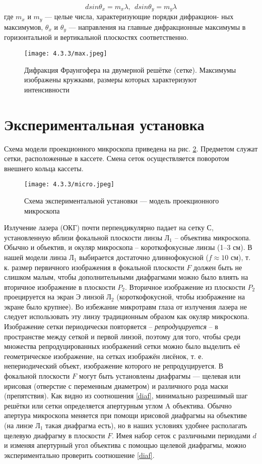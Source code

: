 \documentclass[a4paper,12pt]{article} %
\begin{document}
\begin{equation}
    dsin\theta_x = m_x\lambda,\  \  dsin\theta_y=m_y\lambda
\end{equation}
где $m_x$ и $m_y$ — целые числа, характеризующие порядки дифракцион- ных максимумов, $\theta_x$ и $\theta_y$ — направления на главные дифракционные максимумы в горизонтальной и вертикальной плоскостях соответственно.

\begin{figure}[H]
    \centering
    \texttt{[image: 4.3.3/max.jpeg]}
    \caption{\centering Дифракция Фраунгофера на двумерной решётке (сетке). Максимумы изображены кружками, размеры которых характеризуют интенсивности}
    \label{max}
\end{figure}

\section{Экспериментальная установка}

Схема модели проекционного микроскопа приведена на рис. \ref{micro}. Предметом служат сетки, расположенные в кассете. Смена сеток осуществляется поворотом внешнего кольца кассеты.

\begin{figure}[H]
    \centering
    \texttt{[image: 4.3.3/micro.jpeg]}
    \caption{Схема экспериментальной установки — модель проекционного микроскопа}
    \label{micro}
\end{figure}

Излучение лазера (ОКГ) почти перпендикулярно падает на сетку С, установленную вблизи фокальной плоскости линзы Л$_1$ -- объектива микроскопа. Обычно и объектив, и окуляр микроскопа -- короткофокусные линзы (1–3 см). В нашей модели линза Л$_1$ выбирается достаточно длиннофокусной ($f \approx 10$ см), т. к. размер первичного изображения в фокальной плоскости $F$ должен быть не слишком малым, чтобы дополнительными диафрагмами можно было влиять на вторичное изображение в плоскости $P_2$. Вторичное изображение из плоскости $P_2$ проецируется на экран Э линзой Л$_2$ (короткофокусной, чтобы изображение на экране было крупнее). Во избежание микротравм глаза от излучения лазера не следует использовать эту линзу традиционным образом как окуляр микроскопа.
Изображение сетки периодически повторяется -- \textit{репродуцируется} -- в пространстве между сеткой и первой линзой, поэтому для того, чтобы среди множества репродуцированных изображений сетки можно было выделить её геометрическое изображение, на сетках изображён лисёнок, т. е. непериодический объект, изображение которого не репродуцируется.
В фокальной плоскости $F$ могут быть установлены диафрагмы — щелевая или ирисовая (отверстие с переменным диаметром) и различного рода маски (препятствия).
Как видно из соотношения \eqref{diaf}, минимально разрешимый шаг решётки или сетки определяется апертурным углом A объектива. Обычно апертура микроскопа меняется при помощи ирисовой диафрагмы на объективе (на линзе Л$_1$ такая диафрагма есть), но в наших условиях удобнее располагать щелевую диафрагму в плоскости $F$. Имея набор сеток с различными периодами $d$ и изменяя апертурный угол объектива с помощью щелевой диафрагмы, можно экспериментально проверить соотношение \eqref{diaf}.
\end{document}
